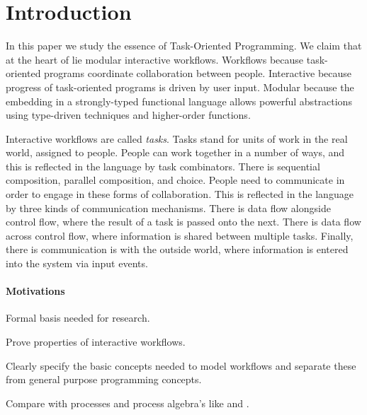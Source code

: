 


\section{Introduction}

In this paper we study the essence of Task-Oriented Programming.
We claim that at the heart of \TOP lie modular interactive workflows.
Workflows because task-oriented programs coordinate collaboration between people.
Interactive because progress of task-oriented programs is driven by user input.
Modular because the embedding in a strongly-typed functional language allows powerful abstractions using type-driven techniques and higher-order functions.

Interactive workflows are called \emph{tasks}.
Tasks stand for units of work in the real world, assigned to people.
People can work together in a number of ways, and this is reflected in the language by task combinators.
There is sequential composition, parallel composition, and choice.
People need to communicate in order to engage in these forms of collaboration.
This is reflected in the language by three kinds of communication mechanisms.
There is data flow alongside control flow, where the result of a task is passed onto the next.
There is data flow across control flow, where information is shared between multiple tasks.
Finally, there is communication is with the outside world, where information is entered into the system via input events.


\paragraph{Motivations}
\begin{itemize*}
  \item Formal basis needed for research.
  \item Prove properties of interactive workflows.
  \item Clearly specify the basic concepts needed to model workflows
    and separate these from general purpose programming concepts.
  \item Compare \TOP with processes and process algebra's like \CSP and \CCS.
\end{itemize*}


